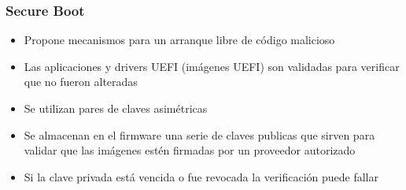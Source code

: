 \begin{frame}
	\frametitle{Secure Boot}
	\begin{itemize}
		\item Propone mecanismos para un arranque libre de código malicioso
		\item Las aplicaciones y drivers UEFI (imágenes UEFI) son validadas para verificar que no fueron alteradas
		\item Se utilizan pares de claves asimétricas
		\item Se almacenan en el firmware una serie de claves publicas que sirven para validar que las imágenes estén firmadas por un proveedor autorizado
		\item Si la clave privada está vencida o fue revocada la verificación puede fallar
	\end{itemize}
\end{frame}